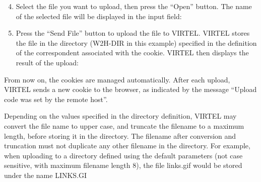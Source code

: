 \documentclass[letterpaper,10pt,english]{sphinxmanual}
\begin{document}

\begin{enumerate}
\setcounter{enumi}{3}
\item {} 
Select the file you want to upload, then press the “Open” button. The name of the selected file will be displayed in the input field:

\end{enumerate}


\begin{enumerate}
\setcounter{enumi}{4}
\item {} 
Press the “Send File” button to upload the file to VIRTEL. VIRTEL stores the file in the directory (W2H-DIR in this example) specified in the definition of the correspondent associated with the cookie. VIRTEL then displays the result of the upload:

\end{enumerate}



From now on, the cookies are managed automatically. After each upload, VIRTEL sends a new cookie to the browser, as indicated by the message “Upload code was set by the remote host”.

Depending on the values specified in the directory definition, VIRTEL may convert the file name to upper case, and truncate the filename to a maximum length, before storing it in the directory. The filename after conversion and truncation must not duplicate any other filename in the directory. For example, when uploading to a directory defined using the default parameters (not case sensitive, with maximum filename length 8), the file links.gif would be stored under the name LINKS.GI

\end{document}

